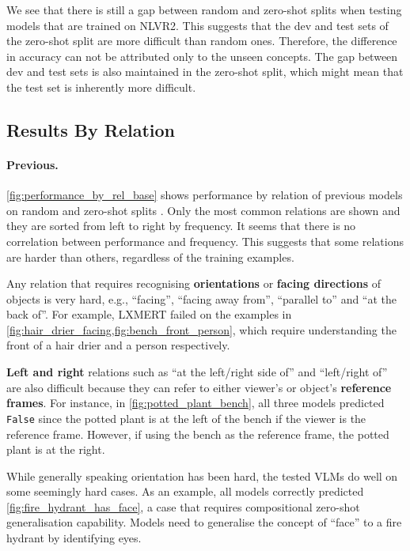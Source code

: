 We see that there is still a gap between random and zero-shot splits when testing models that are trained on NLVR2. This suggests that the dev and test sets of the zero-shot split are more difficult than random ones. Therefore, the difference in accuracy can not be attributed only to the unseen concepts. The gap between dev and test sets is also maintained in the zero-shot split, which might mean that the test set is inherently more difficult.

\subsection{Results By Relation} \label{vsr_results_relation}

\paragraph{Previous.}
\cref{fig:performance_by_rel_base} shows performance by relation of previous models on random and zero-shot splits \cite{liu2022visual}. Only the most common relations are shown and they are sorted from left to right by frequency. It seems that there is no correlation between performance and frequency. This suggests that some relations are harder than others, regardless of the training examples.

Any relation that requires recognising \textbf{orientations} or \textbf{facing directions} of objects is very hard, e.g., ``facing'', ``facing away from'', ``parallel to'' and ``at the back of''. For example, LXMERT failed on the examples  in \cref{fig:hair_drier_facing,fig:bench_front_person}, which require understanding the front of a hair drier and a person respectively.

\textbf{Left and right} relations such as ``at the left/right side of'' and ``left/right of'' are also difficult because they can refer to either viewer's or object's \textbf{reference frames}. For instance, in \cref{fig:potted_plant_bench}, all three models predicted \texttt{False} since the potted plant is at the left of the bench if the viewer is the reference frame. However, if using the bench as the reference frame, the potted plant is at the right.

While generally speaking orientation has been hard, the tested VLMs do well on some seemingly hard cases. As an example, all models correctly predicted \cref{fig:fire_hydrant_has_face}, a case that requires compositional zero-shot generalisation capability. Models need to generalise the concept of ``face'' to a fire hydrant by identifying eyes.

